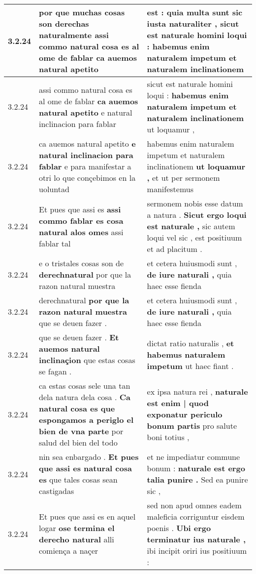 \begin{tabular}{|p{1cm}|p{6.5cm}|p{6.5cm}|}
3.2.24 & por que muchas cosas son derechas naturalmente \textbf{ assi commo natural cosa es al ome de fablar } ca auemos natural apetito & est : quia multa sunt sic iusta naturaliter , \textbf{ sicut est naturale homini loqui : } habemus enim naturalem impetum et naturalem inclinationem \\\hline
3.2.24 & assi commo natural cosa es al ome de fablar \textbf{ ca auemos natural apetito } e natural inclinacion para fablar & sicut est naturale homini loqui : \textbf{ habemus enim naturalem impetum et naturalem inclinationem } ut loquamur , \\\hline
3.2.24 & ca auemos natural apetito \textbf{ e natural inclinacion para fablar } e para manifestar a otri lo que conçebimos en la uoluntad & habemus enim naturalem impetum et naturalem inclinationem \textbf{ ut loquamur , } et ut per sermonem manifestemus \\\hline
3.2.24 & Et pues que assi es \textbf{ assi commo fablar es cosa natural alos omes } assi fablar tal & sermonem nobis esse datum a natura . \textbf{ Sicut ergo loqui est naturale , } sic autem loqui vel sic , est positiuum et ad placitum . \\\hline
3.2.24 & e o tristales cosas son de \textbf{ derechnatural } por que la razon natural muestra & et cetera huiusmodi sunt , \textbf{ de iure naturali , } quia haec esse fienda \\\hline
3.2.24 & derechnatural \textbf{ por que la razon natural muestra } que se deuen fazer . & et cetera huiusmodi sunt , \textbf{ de iure naturali , } quia haec esse fienda \\\hline
3.2.24 & que se deuen fazer . \textbf{ Et auemos natural inclinaçion } que estas cosas se fagan . & dictat ratio naturalis , \textbf{ et habemus naturalem impetum } ut haec fiant . \\\hline
3.2.24 & ca estas cosas sele una tan dela natura dela cosa . \textbf{ Ca natural cosa es que espongamos a periglo el bien de vna parte } por salud del bien del todo & ex ipsa natura rei , \textbf{ naturale est enim | quod exponatur periculo bonum partis } pro salute boni totius , \\\hline
3.2.24 & nin sea enbargado . \textbf{ Et pues que assi es natural cosa es } que tales cosas sean castigadas & et ne impediatur commune bonum : \textbf{ naturale est ergo talia punire . } Sed ea punire sic , \\\hline
3.2.24 & Et pues que assi es en aquel logar \textbf{ ose termina el derecho natural } alli comiença a naçer & sed non apud omnes eadem maleficia corriguntur eisdem poenis . \textbf{ Ubi ergo terminatur ius naturale , } ibi incipit oriri ius positiuum : \\\hline

\end{tabular}
